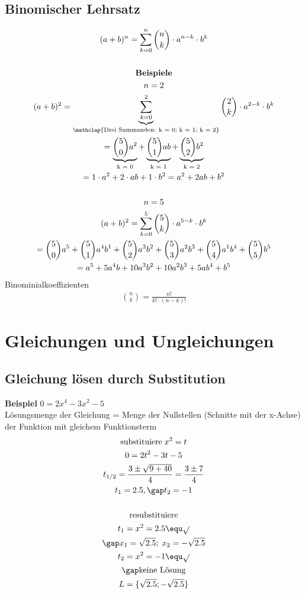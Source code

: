 \subsection{Binomischer Lehrsatz}
\begin{gather*}
  (a + b)^n = \sum_{k=0}^n \binom{n}{k} \cdot a^{n-k} \cdot b^k \\\\
  \textbf{Beispiele} \\
  n = 2 \\
  (a + b)^2 = \underbrace{\sum_{k=0}^2}_{\mathclap{\text{Drei Summanden: k = 0; k = 1; k = 2}}} \binom{2}{k} \cdot a^{2-k} \cdot b^k \\
  = \underbrace{\binom{5}{0}a^2}_{\text{k = 0}} + \underbrace{\binom{5}{1}ab}_{\text{k = 1}} + \underbrace{\binom{5}{2}b^2}_{\text{k = 2}} \\
  = 1 \cdot a^2 + 2 \cdot ab + 1 \cdot b^2 = a^2 + 2ab + b^2 \\\\
  n = 5 \\
  (a + b)^2 = \sum_{k=0}^5 \binom{5}{k} \cdot a^{5-k} \cdot b^k \\
  = \binom{5}{0}a^5 + \binom{5}{1}a^4b^{1} + \binom{5}{2}a^3b^2 + \binom{5}{3}a^2b^3 + \binom{5}{4}a^{1}b^4 + \binom{5}{5}b^5 \\
  = a^5 + 5a^4b + 10a^3b^2 + 10a^2b^3 + 5ab^4 + b^5
\end{gather*}
Binominialkoeffizienten
\begin{gather*}
  \binom{n}{k} = \frac{n!}{k! \cdot (n - k)!}
\end{gather*}

\section{Gleichungen und Ungleichungen}

\subsection{Gleichung lösen durch Substitution}
\textbf{Beispiel} $ 0 = 2x^4 - 3x^2 - 5 $ \\
Lösungsmenge der Gleichung = Menge der Nullstellen (Schnitte mit der x-Achse) der Funktion mit gleichem Funktionsterm \\
\begin{gather*}
  \text{substituiere} \; x^2 = t \\
  0 = 2t^2 - 3t - 5 \\
  t_{1/2} = \frac{3 \pm \sqrt{9 + 40}}{4} = \frac{3 \pm 7}{4} \\
  t_1 = 2.5, \gap t_2 = -1 \\\\
  \text{resubstituiere} \\
  t_1 = x^2 = 2.5 \equ \sqrt{} \\
  \gap x_1 = \sqrt{2.5}; \; x_2 = -\sqrt{2.5} \\
  t_2 = x^2 = -1 \equ \sqrt{} \\
  \gap \text{keine Lösung} \\
  L = \{\sqrt{2.5}; -\sqrt{2.5}\}
\end{gather*}


